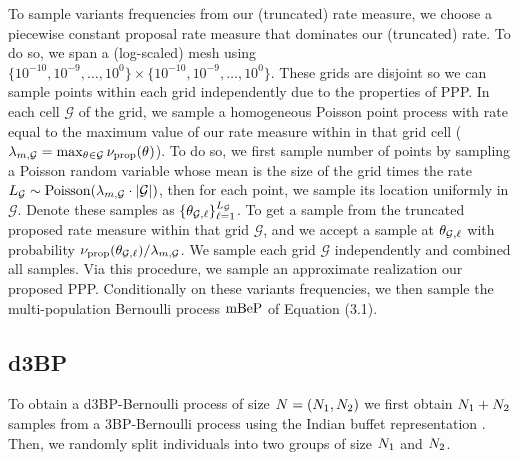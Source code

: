 To sample variants frequencies from our (truncated) rate measure, we choose a piecewise constant proposal rate measure that dominates our (truncated) rate. To do so, we span a (log-scaled) mesh using $\{10^{-10},10^{-9},\dots, 10^{0}\} \times \{10^{-10},10^{-9},\dots, 10^{0}\}$. These grids are disjoint so we can sample points within each grid independently due to the properties of PPP. In each cell $\mathcal{G}$ of the grid, we sample a homogeneous Poisson point process with rate equal to the maximum value of our rate measure within in that grid cell ($\lambda_{m,\mathcal{G}}=\max_{\vecvariantfreq{}\in \mathcal{G}} \ratemeasproposed(\vecvariantfreq{})$). To do so, we first sample number of points by sampling a Poisson random variable whose mean is the size of the grid times the rate $L_{\mathcal{G}}\sim \operatorname{Poisson}(\lambda_{m,\mathcal{G}}\cdot|\mathcal{G}|)$, then for each point, we sample its location uniformly in $\mathcal{G}$. Denote these samples as $\{\vecvariantfreq{\mathcal{G},\variantidx}\}_{\variantidx=1}^{L_{\mathcal{G}}}$. To get a sample from the truncated proposed rate measure within that grid $\mathcal{G}$, and we accept a sample at $\vecvariantfreq{\mathcal{G},\variantidx}$ with probability $\ratemeasproposed(\vecvariantfreq{\mathcal{G},\variantidx})/\lambda_{m,\mathcal{G}}$. We sample each grid $\mathcal{G}$ independently and combined all samples. Via this procedure, we sample an approximate realization our proposed PPP. Conditionally on these variants frequencies, we then sample the multi-population Bernoulli process $\mathrm{mBeP}$ of Equation (3.1). 




\subsection{d3BP}
To obtain a d3BP-Bernoulli process of size $\vecsamplesize = (\samplesize{1}, \samplesize{2})$ we first obtain $N_{1} + N_{2}$ samples from a 3BP-Bernoulli process using the Indian buffet representation \citep{Broderick2012,Masoero2021}. Then, we randomly split individuals into two groups of size $N_{1}$ and $N_{2}$. 

